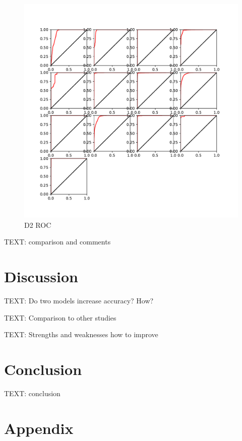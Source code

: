 \documentclass{article}
\begin{document}
	\begin{figure}[htbp]
		\centering
		\includegraphics[width=\linewidth]{Figs/diagnosis2_ROC.pdf}
		\caption{D2 ROC}
		\vspace{0.3cm}
		\label{fig:D2_ROC}
	\end{figure}
	TEXT: comparison and comments
	
	\section{Discussion}
	
	TEXT: Do two models increase accuracy? How?
	
	TEXT: Comparison to other studies
	
	TEXT: Strengths and weaknesses
	how to improve
	
	\section{Conclusion}
	
	TEXT: conclusion
	
	\newrefcontext[sorting=nyt]
	\printbibliography
	
	\pagebreak
	\section*{Appendix}
	
\end{document}
